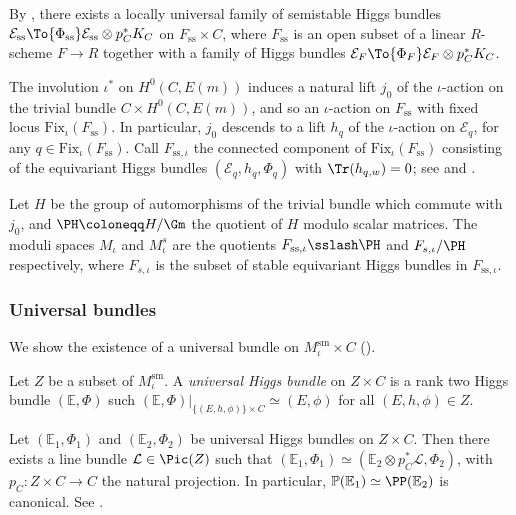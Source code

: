 By \cite[Prop.\,3.6]{Nitsure91}, there exists a locally universal family of semistable Higgs bundles $\mathcal{E}_\mathrm{ss} \To{\Phi_\mathrm{ss}} \mathcal{E}_\mathrm{ss} \otimes p_C^*K_C$ on $F_\mathrm{ss} \times C$, where $F_\mathrm{ss}$ is an open subset of a linear $R$-scheme $F \to R$ together with a family of Higgs bundles $\mathcal{E}_F \To{\Phi_F} \mathcal{E}_F \otimes p_C^*K_C$.

The involution $\iota^*$ on $H^0(C, E(m))$ induces a natural lift $j_0$ of the $\iota$-action on the trivial bundle $C \times H^0(C, E(m))$, and so an $\iota$-action on $F_\mathrm{ss}$ with fixed locus $\mathrm{Fix}_{\iota}(F_\mathrm{ss})$. In particular, $j_0$ descends to a lift $h_q$ of the $\iota$-action on $\mathcal{E}_q$, for any $q \in \mathrm{Fix}_{\iota}(F_\mathrm{ss})$. Call $F_{\mathrm{ss}, \iota}$ the connected component of $\mathrm{Fix}_{\iota}(F_\mathrm{ss})$ consisting of the equivariant Higgs bundles $(\mathcal{E}_q,h_q, \Phi_q)$ with $\Tr(h_{q, w})=0$; see \cite[Chap.\,II, Prop.\,6(iv)]{Seshadri70} and \cite[Chap.\,II, Prop.\,5 \& Rem.\,2]{Seshadri70}.

Let $H$ be the group of automorphisms of the trivial bundle which commute with~$j_0$, and $\PH\coloneqq H/\Gm$ the quotient of $H$ modulo scalar matrices. The moduli spaces $M_{\iota}$ and $M_{\iota}^s$ are the quotients $F_{\mathrm{ss}, \iota}\sslash \PH$ and $F_{s, \iota}/\PH$ respectively, where $F_{s, \iota}$ is the subset of stable equivariant Higgs bundles in $F_{\mathrm{ss}, \iota}$.

\subsubsection{Universal bundles}\label{sec:Universalbundle}
We show the existence of a universal bundle on $M^{\mathrm{sm}}_{\iota} \times C$ (\cf \cite[\S 5]{Hausel98}).

\begin{defn}
Let $Z$ be a subset of $M^{\mathrm{sm}}_{\iota}$. A \emph{universal Higgs bundle} on $Z \times C$ is a rank two Higgs bundle $(\mathbb{E}, \Phi)$ such
$(\mathbb{E}, \Phi)|_{\{(E, h, \phi)\}\times C}\simeq (E, \phi)$ for all $(E, h, \phi)\in Z$.
\end{defn}

\begin{rmk}\label{rmk:tensorization}
Let $(\mathbb{E}_1, \Phi_1)$ and $(\mathbb{E}_2, \Phi_2)$ be universal Higgs bundles on $Z \times C$. Then there exists a line bundle $\mathcal{L} \in \Pic(Z)$ such that $(\mathbb{E}_1, \Phi_1) \simeq (\mathbb{E}_2 \otimes p_C^*\mathcal{L}, \Phi_2)$, with $p_C\colon Z \times C \to C$ the natural projection. In particular, $\mathbb{P}(\mathbb{E}_1)\simeq \PP(\mathbb{E}_2)$ is canonical. See \cite[4.2]{HauselThaddeus04}.
\end{rmk}

